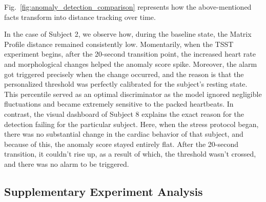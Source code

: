 \documentclass[conference,10pt]{IEEEtran}
\begin{document}
Fig.~\ref{fig:anomaly_detection_comparison} represents how the above-mentioned facts transform into distance tracking over time. 

In the case of Subject 2, we observe how, during the baseline state, the Matrix Profile distance remained consistently low. Momentarily, when the TSST experiment begins, after the 20-second transition point, the increased heart rate and morphological changes helped the anomaly score spike. Moreover, the alarm got triggered precisely when the change occurred, and the reason is that the personalized threshold was perfectly calibrated for the subject’s resting state. This percentile served as an optimal discriminator as the model ignored negligible fluctuations and became extremely sensitive to the packed heartbeats. 
In contrast, the visual dashboard of Subject 8 explains the exact reason for the detection failing for the particular subject. Here, when the stress protocol began, there was no substantial change in the cardiac behavior of that subject, and because of this, the anomaly score stayed entirely flat. After the 20-second transition, it couldn’t rise up, as a result of which, the threshold wasn’t crossed, and there was no alarm to be triggered.

\subsection{Supplementary Experiment Analysis}
\end{document}

